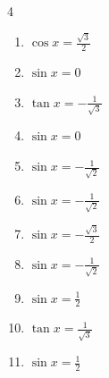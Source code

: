 \begin{multicols}{4}
\begin{enumerate}
  \item $\displaystyle \cos{x}  = \frac{\sqrt{3}}{2}$


  \item $\displaystyle \sin{x}  = 0$

        \phantom{$\displaystyle x = 0 , \pi$}

  \item $\displaystyle \tan{x}  = -\frac{1}{\sqrt{3}}$


  \item $\displaystyle \sin{x}  = 0$

        \phantom{$\displaystyle x = 0 , \pi$}

  \item $\displaystyle \sin{x}  = -\frac{1}{\sqrt{2}}$


  \item $\displaystyle \sin{x}  = -\frac{1}{\sqrt{2}}$


  \item $\displaystyle \sin{x}  = -\frac{\sqrt{3}}{2}$


  \item $\displaystyle \sin{x}  = -\frac{1}{\sqrt{2}}$


  \item $\displaystyle \sin{x}  = \frac{1}{2}$


\columnbreak %

  \item $\displaystyle \tan{x}  = \frac{1}{\sqrt{3}}$


  \item $\displaystyle \sin{x}  = \frac{1}{2}$



\end{enumerate}
\end{multicols}
